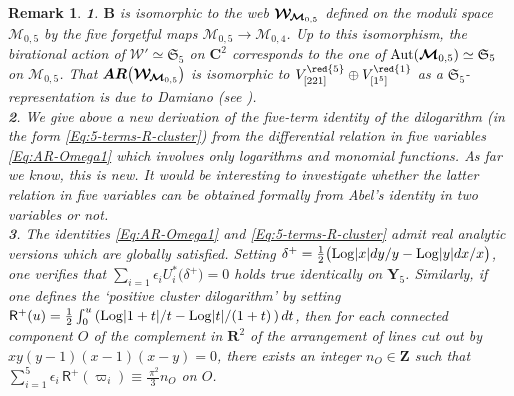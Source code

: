 \documentclass[11pt]{amsart}
\newcommand{\mk}{\medskip}
\newtheorem{rem}[thm]{Remark}
\begin{document}
 \begin{rem}
{\bf 1}.  $\boldsymbol{B}$ is isomorphic to the web $\boldsymbol{\mathcal W}_{\hspace{-0.05cm}\boldsymbol{\mathcal M}_{0,5}}$ 
defined on the moduli space $\boldsymbol{\mathcal M}_{0,5}$ by the five forgetful maps $\boldsymbol{\mathcal M}_{0,5}\rightarrow \boldsymbol{\mathcal M}_{0,4}$. Up to this isomorphism, the birational action of 
$\mathscr W'\simeq \mathfrak S_5$ on $\mathbf C^2$ corresponds to the one of 
${\rm Aut}(\boldsymbol{\mathcal M}_{0,5})\simeq \mathfrak S_5$ on $\boldsymbol{\mathcal M}_{0,5}$.  That $\boldsymbol{AR}\big(
\boldsymbol{\mathcal W}_{\hspace{-0.05cm}\boldsymbol{\mathcal M}_{0,5}}
\big) $ is isomorphic to $V_{[221]}^{{\red{5}}}\oplus   V_{[1^5]}^{{\red{1}}}$ as a $\mathfrak S_5$-representation is due to 
Damiano (see \cite[Remark 3.1]{PirioAFST}{\rm )}.\mk\\
{\bf 2}.  We give above a new derivation of the five-term identity of the dilogarithm 
(in the form \eqref{Eq:5-terms-R-cluster}) from the differential relation in five variables  \eqref{Eq:AR-Omega1} which involves only logarithms and monomial functions. As far we know, this is new. It would be interesting to investigate whether the latter relation in five variables can be obtained formally from Abel's identity in two variables or not. 
\mk\\
{\bf 3}.  The identities 
\eqref{Eq:AR-Omega1} and 
\eqref{Eq:5-terms-R-cluster} admit real analytic versions which are globally satisfied. 
Setting $\delta^+=\frac{1}{2}\big( {\rm Log}\lvert x\lvert dy/y- {\rm Log}\lvert y\lvert dx/x\big)$, one verifies that $\sum_{i=1}\epsilon_i U_i^*\big( \delta^+\big)=0$ holds true identically on $\boldsymbol{Y}_5$. Similarly, if one defines the `positive cluster dilogarithm' by setting 
${\mathsf  R}^+(u)=\frac{1}{2} \int_{0}^u 
\left( 
 {
 {\rm Log}\lvert 1+t \lvert}/{t}
- %
{
 {\rm Log}\lvert t\lvert }/{(1+t)}\,
\right) dt 
$, then  for each connected component $O$ of the complement 
in $\mathbf R^2$
of the arrangement of lines cut out by $xy \left(y -1\right) \left(x -1\right) \left(x -y \right)=0$, there exists an integer $n_O\in \mathbf Z$ such that  
$\sum_{i=1}^5 \epsilon_i \, {\mathsf  R}^+(\varpi_i)\equiv   \frac{{}^{}\, \pi^2}{3} n_O$  on $O$.
 \end{rem}
%
%
%
%
\end{document}
